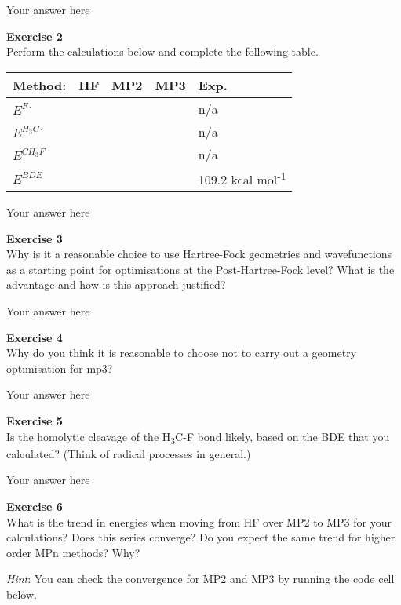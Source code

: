 \documentclass{article}
\begin{document}
Your answer here

\begin{mdframed}
\textbf{Exercise 2}\\
Perform the calculations below and complete the following table.

\bigskip\noindent
\begin{tabular}{p{}p{}p{}p{}p{}}
\toprule
Method: & HF & MP2 & MP3 & Exp. \\
\hline
$E^{F\cdot}$ &  &  &  & n/a \\
$E^{H_3C\cdot}$ &  &  &  & n/a \\
$E^{CH_3F}$ &  &  &  & n/a \\
$E^{BDE}$ &  &  &  & 109.2 kcal mol\textsuperscript{-1} \\
\bottomrule
\end{tabular}

\bigskip
\end{mdframed}

Your answer here

\begin{mdframed}
\textbf{Exercise 3}\\
Why is it a reasonable choice to use Hartree-Fock geometries and
wavefunctions as a starting point for optimisations at the
Post-Hartree-Fock level? What is the advantage and how is this
approach justified?
\end{mdframed}

Your answer here

\begin{mdframed}
\textbf{Exercise 4}\\
Why do you think it is reasonable to choose not to carry out a geometry optimisation for mp3?
\end{mdframed}

Your answer here

\begin{mdframed}
\textbf{Exercise 5}\\
Is the homolytic cleavage of the H\textsubscript{3}C-F bond likely, based on the
BDE that you calculated? (Think of radical processes in general.)
\end{mdframed}

Your answer here

\begin{mdframed}
\textbf{Exercise 6}\\
What is the trend in energies when moving from HF over MP2 to MP3 for your calculations? Does this series converge? Do you expect the same trend for higher order MPn methods? Why?

\textit{Hint}: You can check the convergence for MP2 and MP3 by running the code cell below.
\end{mdframed}
\end{document}
